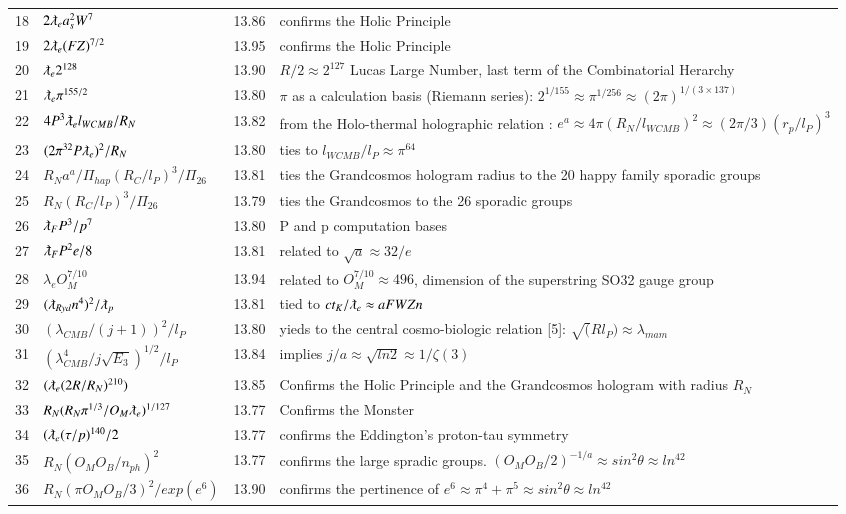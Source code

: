 \documentclass[a4paper,9pt]{article}
\begin{document}
\begin{appendix}
\begin{table}
\begin{tabular}{llll}
    18 & $2\lambdabar_{e} a_s^2 W^7$ & 13.86 & confirms the Holic Principle \\
    19 & $2\lambdabar_{e} (FZ)^{7/2}$ & 13.95 & confirms the Holic Principle \\
    20 & $\lambdabar_{e} 2^{128}$ & 13.90 & $R/2 \approx 2^{127}$ Lucas Large Number, last term of the Combinatorial Herarchy\\
    21 & $\lambdabar_{e} \pi^{155/2}$ & 13.80 & $\pi$ as a calculation basis (Riemann series): $2^{1/155} \approx \pi^{1/256} \approx (2\pi)^{1/(3\times 137)}$ \\
    22 & $4P^3\lambdabar_{e} l_{WCMB} /R_N$ & 13.82 & from the Holo-thermal holographic relation : $e^a \approx 4\pi (R_N/l_{WCMB} )^2 \approx (2\pi /3) (r_p/l_P)^3$  \\
    23 & $(2\pi^{32}P\lambdabar_{e})^2 /R_N$ & 13.80 & ties to $l_{WCMB}/l_P \approx \pi^{64}$\\        
    24 & $R_N a^a/\Pi_{hap} (R_{C}/l_P)^3/\Pi_{26}$ & 13.81 & ties the Grandcosmos hologram radius to the 20 happy family sporadic groups\\  
    25 & $R_N (R_{C}/l_P)^3/\Pi_{26}$ & 13.79 & ties the Grandcosmos to the 26 sporadic groups\\   
    26 & $\lambdabar_{F} P^3 /p^7$ & 13.80 & P and p computation bases\\      
    27 & $\lambdabar_{F} P^2 e/8$ & 13.81 &  related to $\sqrt a  \approx 32/e$ \\     
    28 &  $\lambda_{e} O_M^{7/10}$ & 13.94 &  related to $O_M^{7/10} \approx 496$, dimension of the superstring SO32 gauge group  \\
    29 & $(\lambdabar_{Ryd} n^{4})^2/\lambdabar_p$ & 13.81 & tied to $ct_K/\lambdabar_e \approx aFWZn$ \\ 
    30 & $(\lambda_{CMB}/(j+1))^2/l_P$ & 13.80 & yieds to the central cosmo-biologic relation [5]: $\sqrt(Rl_P) \approx \lambda_{mam}$ \\
    31 & $(\lambda_{CMB}^4/j\sqrt{E_3})^{1/2}/l_P$ & 13.84 & implies $j/a \approx \sqrt{ln2} \approx 1/\zeta(3)$\\ 
    32 & $(\lambdabar_{e} (2R/R_N)^{210})$ & 13.85 & Confirms the Holic Principle and the  Grandcosmos hologram with radius $R_N$  \\
    33 & $R_N(R_N \pi^{1/3}/O_M\lambdabar_{e})^{1/127}$ & 13.77 & Confirms the Monster  \\
    34& $(\lambdabar_{e} (\tau /p)^{140}/2$ & 13.77 & confirms the Eddington's proton-tau symmetry \\
    35& $R_N (O_M O_B/n_{ph})^2$ & 13.77 & confirms the large spradic groups. $(O_M O_B/2)^{-1/a} \approx sin^2\theta \approx ln^42$ \\
    36 & $R_N (\pi O_M O_B/3)^2 / exp(e^6)$ & 13.90 & confirms the pertinence of $e^6 \approx \pi^4 + \pi^5  \approx sin^2\theta \approx ln^42$ \\
    

\end{tabular}
\end{table}
\end{appendix}
\end{document}

